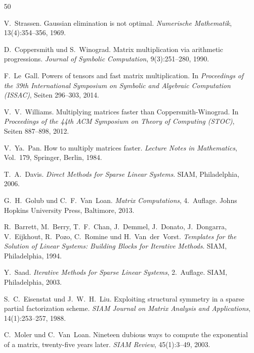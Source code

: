 \documentclass[a4paper,12pt]{report}
\theoremstyle{definition}
\begin{document}
\begin{thebibliography}{50}

V.~Strassen.
\newblock Gaussian elimination is not optimal.
\newblock \textit{Numerische Mathematik}, 13(4):354--356, 1969.

D.~Coppersmith und S.~Winograd.
\newblock Matrix multiplication via arithmetic progressions.
\newblock \textit{Journal of Symbolic Computation}, 9(3):251--280, 1990.

F.~Le~Gall.
\newblock Powers of tensors and fast matrix multiplication.
\newblock In \textit{Proceedings of the 39th International Symposium on Symbolic and Algebraic Computation (ISSAC)}, Seiten 296--303, 2014.

V.~V.~Williams.
\newblock Multiplying matrices faster than Coppersmith-Winograd.
\newblock In \textit{Proceedings of the 44th ACM Symposium on Theory of Computing (STOC)}, Seiten 887--898, 2012.

V.~Ya.~Pan.
\newblock How to multiply matrices faster.
\newblock \textit{Lecture Notes in Mathematics}, Vol.~179, Springer, Berlin, 1984.

T.~A.~Davis.
\newblock \textit{Direct Methods for Sparse Linear Systems}.
\newblock SIAM, Philadelphia, 2006.

G.~H.~Golub und C.~F.~Van~Loan.
\newblock \textit{Matrix Computations}, 4.~Auflage.
\newblock Johns Hopkins University Press, Baltimore, 2013.

R.~Barrett, M.~Berry, T.~F.~Chan, J.~Demmel, J.~Donato, J.~Dongarra, V.~Eijkhout, R.~Pozo, C.~Romine und H.~Van~der~Vorst.
\newblock \textit{Templates for the Solution of Linear Systems: Building Blocks for Iterative Methods}.
\newblock SIAM, Philadelphia, 1994.

Y.~Saad.
\newblock \textit{Iterative Methods for Sparse Linear Systems}, 2.~Auflage.
\newblock SIAM, Philadelphia, 2003.

S.~C.~Eisenstat und J.~W.~H.~Liu.
\newblock Exploiting structural symmetry in a sparse partial factorization scheme.
\newblock \textit{SIAM Journal on Matrix Analysis and Applications}, 14(1):253--257, 1988.

C.~Moler und C.~Van~Loan.
\newblock Nineteen dubious ways to compute the exponential of a matrix, twenty-five years later.
\newblock \textit{SIAM Review}, 45(1):3--49, 2003.


\end{thebibliography}
\end{document}
